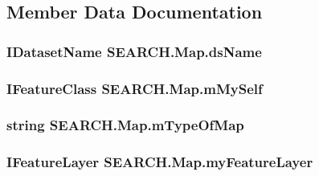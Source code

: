 \subsection{Member Data Documentation}
\hypertarget{class_s_e_a_r_c_h_1_1_map_a7574d4bb88c0b061549c9dece3001a23}{
\subsubsection[{ds\-Name}]{\setlength{\rightskip}{0pt plus 5cm}I\-Dataset\-Name S\-E\-A\-R\-C\-H.\-Map.\-ds\-Name\hspace{0.3cm}{\ttfamily [protected]}}}\label{class_s_e_a_r_c_h_1_1_map_a7574d4bb88c0b061549c9dece3001a23}
\hypertarget{class_s_e_a_r_c_h_1_1_map_af2222aba365913cbc5c4b2079548c239}{
\subsubsection[{m\-My\-Self}]{\setlength{\rightskip}{0pt plus 5cm}I\-Feature\-Class S\-E\-A\-R\-C\-H.\-Map.\-m\-My\-Self\hspace{0.3cm}{\ttfamily [protected]}}}\label{class_s_e_a_r_c_h_1_1_map_af2222aba365913cbc5c4b2079548c239}
\hypertarget{class_s_e_a_r_c_h_1_1_map_a90d4766a33cf7449b2c8718444529f57}{
\subsubsection[{m\-Type\-Of\-Map}]{\setlength{\rightskip}{0pt plus 5cm}string S\-E\-A\-R\-C\-H.\-Map.\-m\-Type\-Of\-Map\hspace{0.3cm}{\ttfamily [protected]}}}\label{class_s_e_a_r_c_h_1_1_map_a90d4766a33cf7449b2c8718444529f57}
\hypertarget{class_s_e_a_r_c_h_1_1_map_a9e7228cbe13122db7eaaab6b9d082ee7}{
\subsubsection[{my\-Feature\-Layer}]{\setlength{\rightskip}{0pt plus 5cm}I\-Feature\-Layer S\-E\-A\-R\-C\-H.\-Map.\-my\-Feature\-Layer\hspace{0.3cm}{\ttfamily [protected]}}}\label{class_s_e_a_r_c_h_1_1_map_a9e7228cbe13122db7eaaab6b9d082ee7}
